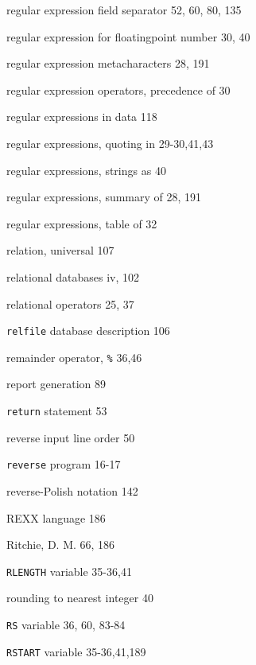 \begin{multicols}{3}
\hangindent=4pc  regular expression field separator 52, 60, 80, 135

\hangindent=4pc  regular expression for floatingpoint number 30, 40



\hangindent=4pc  regular expression metacharacters 28, 191

\hangindent=4pc  regular expression operators, precedence of 30

\hangindent=4pc  regular expressions in data 118

\hangindent=4pc  regular expressions, quoting in 29-30,41,43

\hangindent=4pc  regular expressions, strings as 40

\hangindent=4pc  regular expressions, summary of 28, 191

\hangindent=4pc  regular expressions, table of 32

\hangindent=4pc  relation, universal 107

\hangindent=4pc  relational databases iv, 102

\hangindent=4pc  relational operators 25, 37

\hangindent=4pc  \verb'relfile' database description 106

\hangindent=4pc  remainder operator, \verb'%' 36,46

\hangindent=4pc  report generation 89

\hangindent=4pc  \verb'return' statement 53

\hangindent=4pc  reverse input line order 50

\hangindent=4pc  \verb'reverse' program 16-17

\hangindent=4pc  reverse-Polish notation 142

\hangindent=4pc  REXX language 186

\hangindent=4pc  Ritchie, D. M. 66, 186

\hangindent=4pc  \verb'RLENGTH' variable 35-36,41

\hangindent=4pc  rounding to nearest integer 40

\hangindent=4pc  \verb'RS' variable 36, 60, 83-84

\hangindent=4pc  \verb'RSTART' variable 35-36,41,189


\end{multicols}
